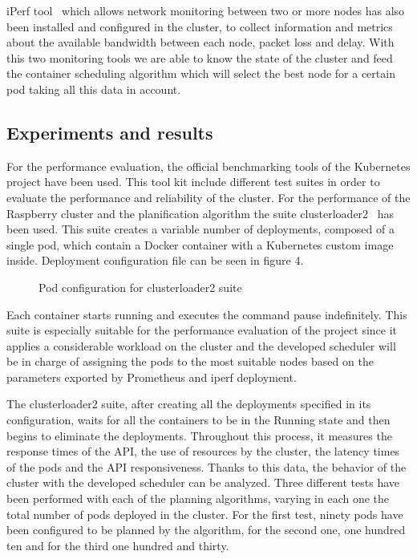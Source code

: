 \documentclass[conference]{IEEEtran}
\begin{document}
iPerf tool~\cite{iperf} which allows network monitoring between two or more nodes has also been installed and configured in the cluster, to collect information and metrics
about the available bandwidth between each node, packet loss and delay. With this two monitoring tools we are able to know the state of the cluster and feed the
container scheduling algorithm which will select the best node for a certain pod taking all this data in account.




\subsection{Experiments and results}\label{sec:expe}

For the performance evaluation, the official benchmarking tools of the Kubernetes project have been used. This tool kit include different test suites in order to evaluate the performance and reliability
of the cluster. For the performance of the Raspberry cluster and the planification algorithm the suite clusterloader2~\cite{clusterloader2}  has been used. This suite creates a variable number of deployments, composed of a single pod, which contain a Docker container with a Kubernetes custom image inside. Deployment configuration file can be seen in figure 4.

\begin{figure}[h]
\begin{center}
\strut{}
\caption{Pod configuration for clusterloader2 suite}\label{fig:cluster}
\end{center}
\end{figure}

Each container starts running and executes the command pause indefinitely. This suite is especially suitable for the performance evaluation of the project since it applies a considerable workload on the cluster and the developed scheduler will be in charge of assigning the pods to the most suitable nodes based on the parameters exported by Prometheus and iperf deployment.

The clusterloader2 suite, after creating all the deployments specified in its configuration, waits for all the containers to be in the Running state and then begins to eliminate the deployments.
Throughout this process, it measures the response times of the API, the use of resources by the cluster, the latency times of the pods and the API responsiveness. Thanks to this data,
the behavior of the cluster with the developed scheduler can be analyzed.
Three different tests have been performed with each of the planning algorithms, varying in each one the total number of pods deployed in the cluster. For the first test, ninety pods have been configured to be planned by the algorithm, for the second one, one hundred ten and for the third one hundred and thirty.
\end{document}
